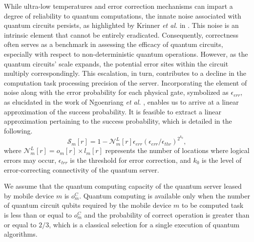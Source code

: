 \documentclass[journal]{IEEEtran}
\begin{document}
While ultra-low temperatures and error correction mechanisms can impart a degree of reliability to quantum computations, the innate noise associated with quantum circuits persists, as highlighted by Krinner {\em et al.} in \cite{krinner2022realizing}. This noise is an intrinsic element that cannot be entirely eradicated.
Consequently, correctness often serves as a benchmark in assessing the efficacy of quantum circuits, especially with respect to non-deterministic quantum operations.
However, as the quantum circuits' scale expands, the potential error sites within the circuit multiply correspondingly.
This escalation, in turn, contributes to a decline in the computation task processing precision of the server.
Incorporating the element of noise along with the error probability for each physical gate, symbolized as $\epsilon_{err}$, as elucidated in the work of Ngoenriang {\em et al.} \cite{ngoenriang2022optimal}, enables us to arrive at a linear approximation of the success probability.
It is feasible to extract a linear approximation pertaining to the success probability, which is detailed in the following.
\begin{equation}\label{eq:7}
\mathcal{S}_m[r]=1-\mathcal{N}_m^L[r]\epsilon_{err}\left({\epsilon_{err}}/{\epsilon_{thr}}\right)^{2^{k_0}},
\end{equation}
where $\mathcal{N}_m^L[r]=o_m[r]\times l_m[r]$ represents the number of locations where logical errors may occur, $\epsilon_{trr}$ is the threshold for error correction, and $k_0$ is the level of error-correcting connectivity of the quantum server.
	
We assume that the quantum computing capacity of the quantum server leased by mobile device $m$ is $o_m^C$. Quantum computing is available only when the number of quantum circuit qubits required by the mobile device $m$ to be computed task is less than or equal to $o_m^C$ and the probability of correct operation is greater than or equal to $2/3$, which is a classical selection for a single execution of quantum algorithms\cite{fellous2022optimizing}.
\end{document}
